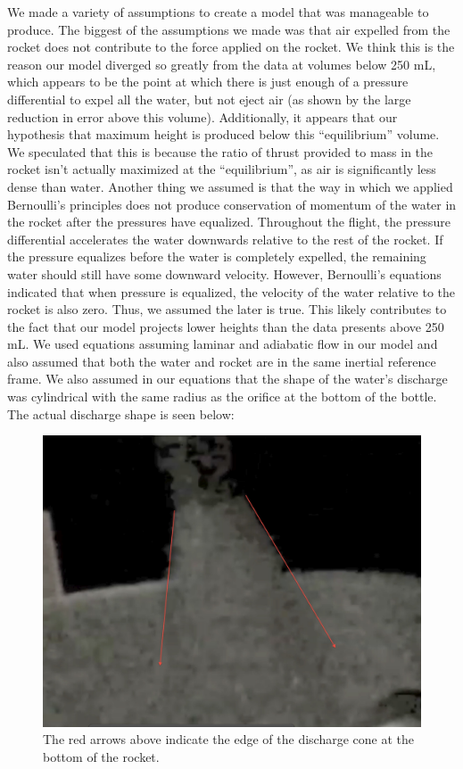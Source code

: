 \documentclass[12pt]{article}
\begin{document}
We made a variety of assumptions to create a model that was manageable to produce. The biggest of the assumptions we made was that air expelled from the rocket does not contribute to the force applied on the rocket. We think this is the reason our model diverged so greatly from the data at volumes below 250 mL, which appears to be the point at which there is just enough of a pressure differential to expel all the water, but not eject air (as shown by the large reduction in error above this volume). Additionally, it appears that our hypothesis that maximum height is produced below this “equilibrium” volume. We speculated that this is because the ratio of thrust provided to mass in the rocket isn’t actually maximized at the “equilibrium”, as air is significantly less dense than water.
  Another thing we assumed is that the way in which we applied Bernoulli's principles does not produce conservation of momentum of the water in the rocket after the pressures have equalized. Throughout the flight, the pressure differential accelerates the water downwards relative to the rest of the rocket. If the pressure equalizes before the water is completely expelled, the remaining water should still have some downward velocity. However, Bernoulli’s equations indicated that when pressure is equalized, the velocity of the water relative to the rocket is also zero. Thus, we assumed the later is true. This likely contributes to the fact that our model projects lower heights than the data presents above 250 mL.
  We used equations assuming laminar and adiabatic flow in our model and also assumed that both the water and rocket are in the same inertial reference frame. We also assumed in our equations that the shape of the water’s discharge was cylindrical with the same radius as the orifice at the bottom of the bottle. The actual discharge shape is seen below:
  
  \begin{figure}[H]
    \includegraphics[scale=.3]{RocketCone.jpg}
    \centering
    \caption{The red arrows above indicate the edge of the discharge cone at the bottom of the rocket.}
    \end{figure}
\end{document}
